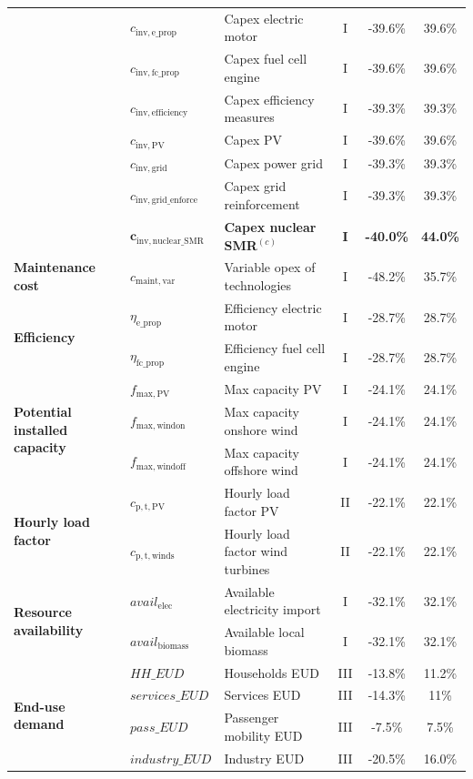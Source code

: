\documentclass[11pt,twoside,a4paper,english]{article}
\begin{document}
\begin{appendices}
\begin{table}[htbp]
{\begin{tabular}{l l l c c c}
& $c_{\mathrm{inv,e\_prop}}$ & Capex electric motor & I & -39.6\% & 39.6\% \\
& $c_{\mathrm{inv,fc\_prop}}$ & Capex fuel cell engine & I & -39.6\% & 39.6\% \\
& $c_{\mathrm{inv,efficiency}}$ & Capex efficiency measures & I & -39.3\%  & 39.3\% \\
& $c_{\mathrm{inv,PV}}$ & Capex PV & I & -39.6\% & 39.6\% \\
& $c_{\mathrm{inv,grid}}$ & Capex power grid & I & -39.3\% & 39.3\% \\
& $c_{\mathrm{inv,grid\_enforce}}$ & Capex grid reinforcement & I & -39.3\% & 39.3\% \\
& $\bm{c_{\mathrm{inv,nuclear\_SMR}}}$ & \textbf{Capex nuclear SMR}$^{(c)}$ & \textbf{I} & \textbf{-40.0\%} & \textbf{44.0\%} \\
\midrule
\textbf{Maintenance cost} & $c_{\mathrm{maint,var}}$ & Variable opex of technologies & I & -48.2\% & 35.7\% \\
\midrule
\multirow{2}{*}{\textbf{Efficiency}} &$\eta_{\mathrm{e\_prop}}$ & Efficiency electric motor & I & -28.7\% & 28.7\% \\
& $\eta_{\mathrm{fc\_prop}}$ & Efficiency fuel cell engine & I & -28.7\% & 28.7\% \\
\midrule
\multirow{3}{*}{\textbf{Potential installed capacity}} &$f_{\mathrm{max,PV}}$ & Max capacity PV & I & -24.1\% & 24.1\% \\
& $f_{\mathrm{max,windon}}$ & Max capacity onshore wind & I & -24.1\% & 24.1\% \\
& $f_{\mathrm{max,windoff}}$ & Max capacity offshore wind & I & -24.1\% & 24.1\% \\
\midrule
\multirow{2}{*}{\textbf{Hourly load factor}} & $c_{\mathrm{p,t,PV}}$ & Hourly load factor PV & II & -22.1\% & 22.1\% \\
& $c_{\mathrm{p,t,winds}}$ & Hourly load factor wind turbines & II & -22.1\% & 22.1\% \\
\midrule
\multirow{2}{*}{\textbf{Resource availability}} & $avail_{\mathrm{elec}}$ & Available electricity import & I & -32.1\% & 32.1\% \\
& $avail_{\mathrm{biomass}}$ & Available local biomass & I & -32.1\% & 32.1\% \\
\midrule

\multirow{4}{*}{\textbf{End-use demand}} &$HH\_EUD$ & Households EUD & III & -13.8\% & 11.2\% \\
& $services\_EUD$ & Services EUD & III & -14.3\% & 11\% \\
& $pass\_EUD$ & Passenger mobility EUD & III & -7.5\% & 7.5\% \\
& $industry\_EUD$ & Industry EUD & III & -20.5\% & 16.0\% \\
\midrule


\end{tabular}}
\end{table}
\end{appendices}
\end{document}
